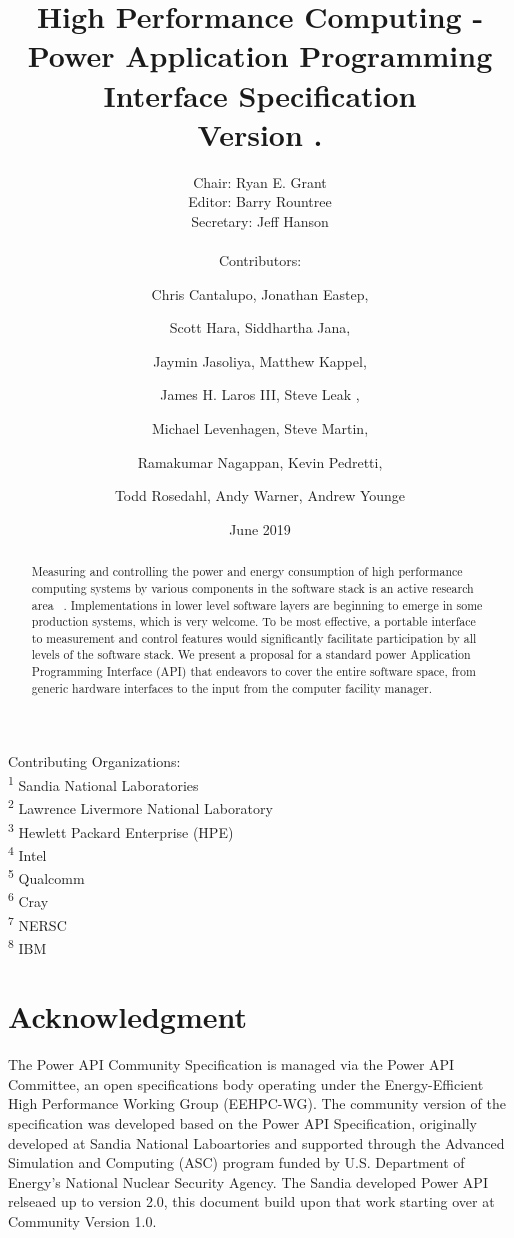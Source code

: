 \documentclass[12pt]{report}
\title{High Performance Computing - Power Application Programming Interface Specification \\ Version \majorversion.\minorversion }
\author{Chair: Ryan E. Grant\Mark{1} 
\\ Editor: Barry Rountree\Mark{2} 
\\ Secretary: Jeff Hanson\Mark{3} 
\\ \\ Contributors:  
\and Chris Cantalupo\Mark{4}, Jonathan Eastep\Mark{4}, 
\and Scott Hara\Mark{5}, Siddhartha Jana\Mark{4},\\ 
\and Jaymin Jasoliya\Mark{4}, Matthew Kappel\Mark{6}, \\ 
\and James H. Laros III\Mark{1}, Steve Leak \Mark{7}, \\ 
\and Michael Levenhagen\Mark{1}, Steve Martin\Mark{6}, \\
\and Ramakumar Nagappan\Mark{4}, Kevin Pedretti\Mark{1}, \\
\and Todd Rosedahl\Mark{8}, Andy Warner\Mark{3}, Andrew Younge\Mark{1}}
\date{June 2019}
\newcommand\Mark[1]{\textsuperscript#1}
\begin{document}
\maketitle

\noindent Contributing Organizations: \\
\Mark{1} Sandia National Laboratories \\
\Mark{2} Lawrence Livermore National Laboratory \\
\Mark{3} Hewlett Packard Enterprise (HPE) \\
\Mark{4} Intel \\
\Mark{5} Qualcomm \\
\Mark{6} Cray \\
\Mark{7} NERSC \\
\Mark{8} IBM \\


\begin{abstract}
Measuring and controlling the power and energy consumption of high performance computing systems by various components in the software stack is an active research area 
~\cite{6604474,6604496,
5488433,
Liu:2012:RCA:2318857.2254779,
Chen:2013:DSP:2561828.2561853,
Yang:2013:IDP:2503210.2503264,
Wallace:2013:CLUSTER:2503210.2503264,
Shoukourian2013,
conf:icdcn:GeorgiouCGAJH14,
Trader:2013:report:GreenComputing,
6337489,
Vishnu:2013:JSC:s11227-011-0699-9,
Mills:2013:EES:2536430.2536432,
Bertran:2013:IBM:2012.2227580,
Georgiou:2013:Bull,
6604481,
6604508}.
Implementations in lower level software layers are beginning to emerge in some production systems, which is very welcome.
To be most effective, a portable interface to measurement and control features would significantly facilitate participation by all levels of the software stack.
We present a proposal for a standard power Application Programming Interface (API) that endeavors to cover the entire software space, from generic hardware interfaces to the input from the computer facility manager.

    \end{abstract}
    \chapter{Acknowledgment}

The Power API Community Specification is managed via the Power API Committee, an open specifications body operating under the Energy-Efficient High Performance Working Group (EEHPC-WG).
The community version of the specification was developed based on the Power API Specification, originally developed at Sandia National Laboartories and supported through the Advanced Simulation and Computing (ASC) program funded by U.S. Department of Energy's National Nuclear Security Agency. The Sandia developed Power API relseaed up to version 2.0, this document build upon that work starting over at Community Version 1.0.
\end{document}

